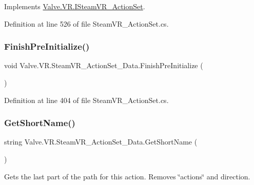 Implements \mbox{\hyperlink{interface_valve_1_1_v_r_1_1_i_steam_v_r___action_set_a7f2befeb3e536b020c6a9a72ac16597b}{Valve.\+V\+R.\+I\+Steam\+V\+R\+\_\+\+Action\+Set}}.



Definition at line 526 of file Steam\+V\+R\+\_\+\+Action\+Set.\+cs.

\mbox{\label{class_valve_1_1_v_r_1_1_steam_v_r___action_set___data_a22949235abc84877f74d3b31a853d4d6}} 
\subsubsection{\texorpdfstring{FinishPreInitialize()}{FinishPreInitialize()}}
{\footnotesize\ttfamily void Valve.\+V\+R.\+Steam\+V\+R\+\_\+\+Action\+Set\+\_\+\+Data.\+Finish\+Pre\+Initialize (\begin{DoxyParamCaption}{ }\end{DoxyParamCaption})}



Definition at line 404 of file Steam\+V\+R\+\_\+\+Action\+Set.\+cs.

\mbox{\label{class_valve_1_1_v_r_1_1_steam_v_r___action_set___data_a6e9b13d26ad3b0743b76564e76a60ffc}} 
\subsubsection{\texorpdfstring{GetShortName()}{GetShortName()}}
{\footnotesize\ttfamily string Valve.\+V\+R.\+Steam\+V\+R\+\_\+\+Action\+Set\+\_\+\+Data.\+Get\+Short\+Name (\begin{DoxyParamCaption}{ }\end{DoxyParamCaption})}



Gets the last part of the path for this action. Removes \char`\"{}actions\char`\"{} and direction. 



